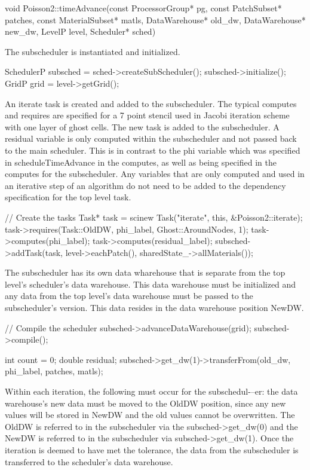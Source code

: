 \documentclass[12pt]{report}
\begin{document}
void Poisson2::timeAdvance(const ProcessorGroup* pg,
			const PatchSubset* patches,
			const MaterialSubset* matls,
			DataWarehouse* old_dw, DataWarehouse* new_dw,
			LevelP level, Scheduler* sched)
{

The subscheduler is instantiated and initialized. 

  SchedulerP subsched = sched->createSubScheduler();
  subsched->initialize();
  GridP grid = level->getGrid();

An iterate task is created and added to the subscheduler.  The typical computes and requires are specified for a 7 point stencil used in Jacobi iteration scheme with one layer of ghost cells.  The new task is added to the subscheduler.   A residual variable is only computed within the subscheduler and not passed back to the main scheduler.  This is in contrast to the phi variable which was specified in scheduleTimeAdvance in the computes, as well as being specified in the computes for the subscheduler.  Any variables that are only computed and used in an iterative step of an algorithm do not need to be added to the dependency specification for the top level task. 

  // Create the tasks
  Task* task = scinew Task("iterate",
			this, &Poisson2::iterate);
  task->requires(Task::OldDW, phi_label, Ghost::AroundNodes, 1);
  task->computes(phi_label);
  task->computes(residual_label);
  subsched->addTask(task, level->eachPatch(), sharedState_->allMaterials());

The subscheduler has its own data wharehouse that is separate from the top level's scheduler's data warehouse.   This data warehouse must be initialized and any data from the top level's data warehouse must be passed to the subscheduler's version.  This data resides in the data warehouse position NewDW.

  // Compile the scheduler
  subsched->advanceDataWarehouse(grid);
  subsched->compile();

  int count = 0;
  double residual;
  subsched->get_dw(1)->transferFrom(old_dw, phi_label, patches, matls);

Within each iteration, the following must occur for the subschedul­-–­er:  the data warehouse's new data must be moved to the OldDW position, since any new values will be stored in NewDW and the old values cannot be overwritten.  The OldDW is referred to in the subscheduler via the subsched->get_dw(0) and the NewDW is referred to in the subscheduler via subsched->get_dw(1).  Once the iteration is deemed to have met the tolerance, the data from the subscheduler is transferred to the scheduler's data warehouse.

}
\end{document}
